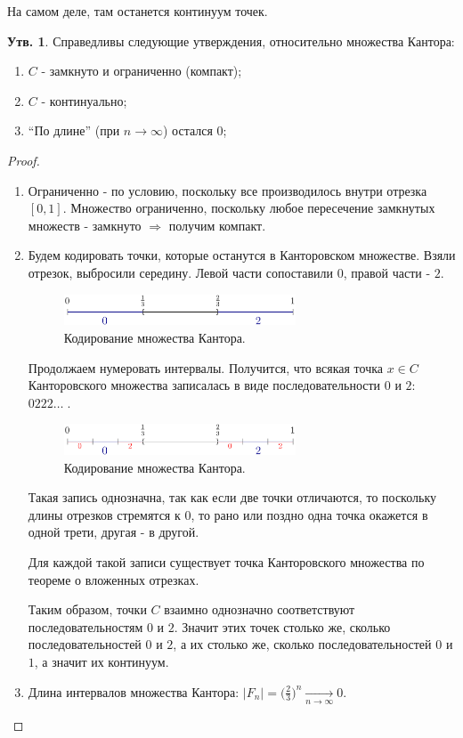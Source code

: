 \documentclass[12pt]{article}
\theoremstyle{definition}
\newtheorem{prop}{Утв.}
\begin{document}
На самом деле, там останется континуум точек.

\begin{prop}Справедливы следующие утверждения, относительно множества Кантора:
	\begin{enumerate}[label={(\arabic*)}]
		\item $C$ - замкнуто и ограниченно (компакт);
		\item $C$ - континуально;
		\item ``По длине'' (при $n \to \infty$) остался 0;
	\end{enumerate}
\end{prop}

\begin{proof}\hfill
	\begin{enumerate}[label={(\arabic*)}]
		\item Ограниченно - по условию, поскольку все производилось внутри отрезка $[0,1]$. Множество ограниченно, поскольку любое пересечение замкнутых множеств - замкнуто $\Rightarrow$ получим компакт. 
		\item Будем кодировать точки, которые останутся в Канторовском множестве. Взяли отрезок, выбросили середину. Левой части сопоставили $0$, правой части - $2$.
		
		\begin{figure}[H]
			\centering
			\includegraphics[width=0.65\textwidth]{14_4.png}
			\caption{Кодирование множества Кантора.}
			\label{14_4}
		\end{figure}
		
		Продолжаем нумеровать интервалы. Получится, что всякая точка $x \in C$ Канторовского множества записалась в виде последовательности $0$ и $2$: $0222\dotsc\;$. 
		
		\begin{figure}[H]
			\centering
			\includegraphics[width=0.65\textwidth]{14_5.png}
			\caption{Кодирование множества Кантора.}
			\label{14_5}
		\end{figure}
		
		Такая запись однозначна, так как если две точки отличаются, то поскольку длины отрезков стремятся к $0$, то рано или поздно одна точка окажется в одной трети, другая - в другой. 
		
		Для каждой такой записи существует точка Канторовского множества по теореме о вложенных отрезках.
		
		Таким образом, точки $C$ взаимно однозначно соответствуют последовательностям $0$ и $2$. Значит этих точек столько же, сколько последовательностей $0$ и $2$, а их столько же, сколько последовательностей $0$ и $1$, а значит их континуум.
		
		\item Длина интервалов множества Кантора: $|F_n| = \big(\frac{2}{3}\big)^n \xrightarrow[n \to \infty]{} 0$.
	\end{enumerate}
\end{proof}
\end{document}
